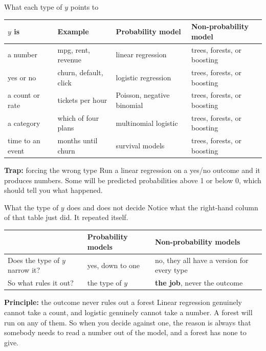 \documentclass[aspectratio=169]{beamer}
\renewcommand{\arraystretch}{1.2}
\newenvironment{principle}[1]{\begin{block}{\textbf{Principle:} #1}}{\end{block}}
\newenvironment{trap}[1]{\begin{alertblock}{\textbf{Trap:} #1}}{\end{alertblock}}
\begin{document}
\begin{frame}{What each type of $y$ points to}
\begin{center}\footnotesize
\renewcommand{\arraystretch}{1.05}%
\begin{tabular}{L{0.15\textwidth} L{0.21\textwidth} L{0.26\textwidth} L{0.24\textwidth}}
\toprule
\textbf{$y$ is} & \textbf{Example} & \textbf{Probability model} & \textbf{Non-probability model} \\
\midrule
a number & mpg, rent, revenue & linear regression & trees, forests, or boosting \\
yes or no & churn, default, click & logistic regression & trees, forests, or boosting \\
a count or rate & tickets per hour & Poisson, negative binomial & trees, forests, or boosting \\
a category & which of four plans & multinomial logistic & trees, forests, or boosting \\
time to an event & months until churn & survival models & trees, forests, or boosting \\
\bottomrule
\end{tabular}
\end{center}
\begin{trap}{forcing the wrong type}
Run a linear regression on a yes/no outcome and it produces numbers. Some will be predicted
probabilities above 1 or below 0, which should tell you what happened.
\end{trap}
\end{frame}

\begin{frame}{What the type of $y$ does and does not decide}
Notice what the right-hand column of that table just did. It repeated itself.
\begin{center}\small
\begin{tabular}{L{0.30\textwidth} L{0.28\textwidth} L{0.30\textwidth}}
\toprule
 & \textbf{Probability models} & \textbf{Non-probability models} \\
\midrule
Does the type of $y$ narrow it? & yes, down to one & no, they all have a version for every type \\
So what rules it out? & the type of $y$ & \textbf{the job}, never the outcome \\
\bottomrule
\end{tabular}
\end{center}
\begin{principle}{the outcome never rules out a forest}
Linear regression genuinely cannot take a count, and logistic genuinely cannot take a number. A
forest will run on any of them. So when you decide against one, the reason is always that
somebody needs to read a number out of the model, and a forest has none to give.
\end{principle}
\end{frame}
\end{document}
